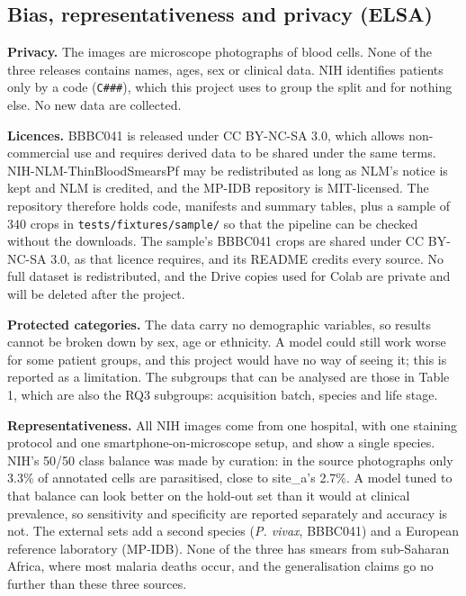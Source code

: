 \documentclass[11pt,a4paper]{article}
\begin{document}
\subsection{Bias, representativeness and privacy (ELSA)}

\textbf{Privacy.} The images are microscope photographs of blood cells. None of the three releases contains names, ages, sex or clinical data. NIH identifies patients only by a code (\texttt{C\#\#\#}), which this project uses to group the split and for nothing else. No new data are collected.

\textbf{Licences.} BBBC041 is released under CC BY-NC-SA 3.0, which allows non-commercial use and requires derived data to be shared under the same terms. NIH-NLM-ThinBloodSmearsPf may be redistributed as long as NLM's notice is kept and NLM is credited, and the MP-IDB repository is MIT-licensed. The repository therefore holds code, manifests and summary tables, plus a sample of 340 crops in \texttt{tests/\allowbreak{}fixtures/\allowbreak{}sample/\allowbreak{}} so that the pipeline can be checked without the downloads. The sample's BBBC041 crops are shared under CC BY-NC-SA 3.0, as that licence requires, and its README credits every source. No full dataset is redistributed, and the Drive copies used for Colab are private and will be deleted after the project.

\textbf{Protected categories.} The data carry no demographic variables, so results cannot be broken down by sex, age or ethnicity. A model could still work worse for some patient groups, and this project would have no way of seeing it; this is reported as a limitation. The subgroups that can be analysed are those in Table 1, which are also the RQ3 subgroups: acquisition batch, species and life stage.

\textbf{Representativeness.} All NIH images come from one hospital, with one staining protocol and one smartphone-on-microscope setup, and show a single species. NIH's 50/50 class balance was made by curation: in the source photographs only 3.3\% of annotated cells are parasitised, close to site\_\allowbreak{}a's 2.7\%. A model tuned to that balance can look better on the hold-out set than it would at clinical prevalence, so sensitivity and specificity are reported separately and accuracy is not. The external sets add a second species (\emph{P. vivax}, BBBC041) and a European reference laboratory (MP-IDB). None of the three has smears from sub-Saharan Africa, where most malaria deaths occur, and the generalisation claims go no further than these three sources.
\end{document}
